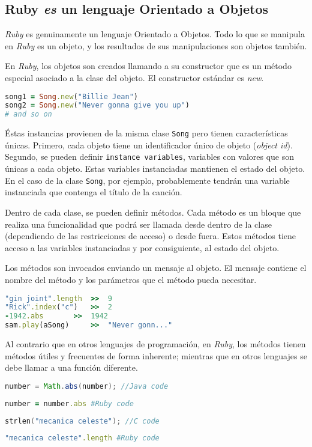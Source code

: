 \subsection{Ruby \emph{es} un lenguaje Orientado a Objetos}
\textit{Ruby} es genuinamente un lenguaje Orientado a Objetos. Todo lo que se manipula en \textit{Ruby} es un objeto, y los resultados de sus manipulaciones son objetos también.

En \textit{Ruby}, los objetos son creados llamando a su constructor que es un método especial asociado a la clase del objeto. El constructor estándar es \textit{new}.

\begin{lstlisting}[language=Ruby]
song1 = Song.new("Billie Jean")
song2 = Song.new("Never gonna give you up")
# and so on
\end{lstlisting}

Éstas instancias provienen de la misma clase \texttt{Song} pero tienen características únicas. Primero, cada objeto tiene un identificador único de objeto (\textit{object id}). Segundo, se pueden definir \texttt{instance variables}, variables con valores que son únicas a cada objeto. Estas variables instanciadas mantienen el estado del objeto. En el caso de la clase \texttt{Song}, por ejemplo, probablemente tendrán una variable instanciada que contenga el título de la canción.

Dentro de cada clase, se pueden definir métodos. Cada método es un bloque que realiza una funcionalidad que podrá ser llamada desde dentro de la clase (dependiendo de las restricciones de acceso) o desde fuera. Estos métodos tiene acceso a las variables instanciadas y por consiguiente, al estado del objeto.

Los métodos son invocados enviando un mensaje al objeto. El mensaje contiene el nombre del método y los parámetros que el método pueda necesitar.

\begin{lstlisting}[language=Ruby]
"gin joint".length	>>	9
"Rick".index("c")	>>	2
-1942.abs		>>	1942
sam.play(aSong)		>>	"Never gonn..."
\end{lstlisting}

Al contrario que en otros lenguajes de programación, en \textit{Ruby}, los métodos tienen métodos útiles y frecuentes de forma inherente; mientras que en otros lenguajes se debe llamar a una función diferente.

\begin{lstlisting}[language=Java]
number = Math.abs(number); //Java code
\end{lstlisting}
\begin{lstlisting}[language=Ruby]
number = number.abs #Ruby code
\end{lstlisting}
\begin{lstlisting}[language=C]
strlen("mecanica celeste"); //C code
\end{lstlisting}
\begin{lstlisting}[language=Ruby]
"mecanica celeste".length #Ruby code
\end{lstlisting}

